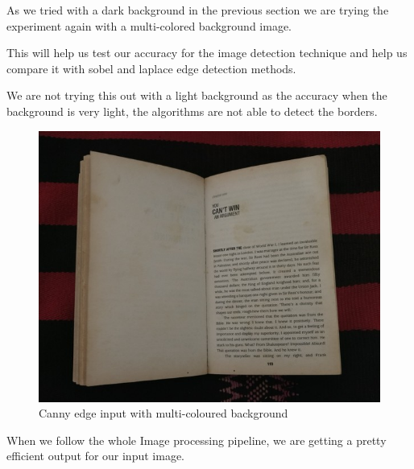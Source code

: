\documentclass[BTech]{srmuthesis}
\begin{document}
As we tried with a dark background in the previous section we are trying the experiment again with a multi-colored background image. 

This will help us test our accuracy for the image detection technique and help us compare it with sobel and laplace edge detection methods.

We are not trying this out with a light background as the accuracy when the background is very light, the algorithms are not able to detect the borders.

\newline

\begin{figure}[h!]
    \centering
    \includegraphics[width=15cm\textwidth]{canny-edge-in2}
    \caption{Canny edge input with multi-coloured background}
    \label{fig:Canny edge input with multi-coloured background}
\end{figure}

\newpage

When we follow the whole Image processing pipeline, we are getting a pretty efficient output for our input image.

\newline
\end{document}
